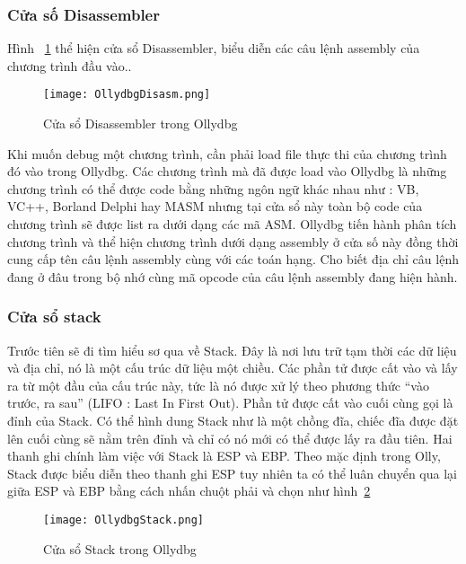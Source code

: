 	\subsubsection*{Cửa số Disassembler}
	Hình ~\ref{fig:OllydbgDisasm} thể hiện cửa sổ Disassembler, biểu diễn các câu lệnh assembly của chương trình đầu vào.. 
		\begin{center}
			\begin{figure}[htp]
				\begin{center}
					\texttt{[image: OllydbgDisasm.png]}
				\end{center}
				\caption{Cửa sổ Disassembler trong Ollydbg}	
					\label{fig:OllydbgDisasm}		
			\end{figure}
		\end{center}		
		
		Khi muốn debug một chương trình, cần phải load file thực thi của chương trình đó vào trong Ollydbg. Các chương trình mà đã được load vào Ollydbg là những chương trình có thể được code bằng những ngôn ngữ khác nhau như : VB, VC++, Borland Delphi hay MASM nhưng tại cửa sổ này toàn bộ code của chương trình sẽ được list ra dưới dạng các mã ASM. Ollydbg tiến hành phân tích chương trình và thể hiện chương trình dưới dạng assembly ở cửa số này đồng thời cung cấp tên câu lệnh assembly cùng với các toán hạng. Cho biết địa chỉ câu lệnh đang ở đâu trong bộ nhớ cùng mã opcode của câu lệnh assembly đang hiện hành. 
	
		\newpage
		\subsubsection*{Cửa sổ stack}
		Trước tiên sẽ đi tìm hiểu sơ qua về Stack. Đây là nơi lưu trữ tạm thời các dữ liệu và địa chỉ, nó là một cấu trúc dữ liệu một chiều. Các phần tử được cất vào và lấy ra từ một đầu của cấu trúc này, tức là nó được xử lý theo phương thức “vào trước, ra sau” (LIFO : Last In First Out). Phần tử được cất vào cuối cùng gọi là đỉnh của Stack. Có thể hình dung Stack như là một chồng đĩa, chiếc đĩa được đặt lên cuối cùng sẽ nằm trên đỉnh và chỉ có nó mới có thể được lấy ra đầu tiên. Hai thanh ghi chính làm việc với Stack là ESP và EBP. Theo mặc định trong Olly, Stack được biểu diễn theo thanh ghi ESP tuy nhiên ta có thể luân chuyển qua lại giữa ESP và EBP bằng cách nhấn chuột phải và chọn như hình~\ref{fig:OllydbgStack}
		\begin{center}
			\begin{figure}[htp]
				\begin{center}
					\texttt{[image: OllydbgStack.png]}
				\end{center}
				\caption{Cửa sổ Stack trong Ollydbg}	
					\label{fig:OllydbgStack}		
			\end{figure}
		\end{center}				
	
